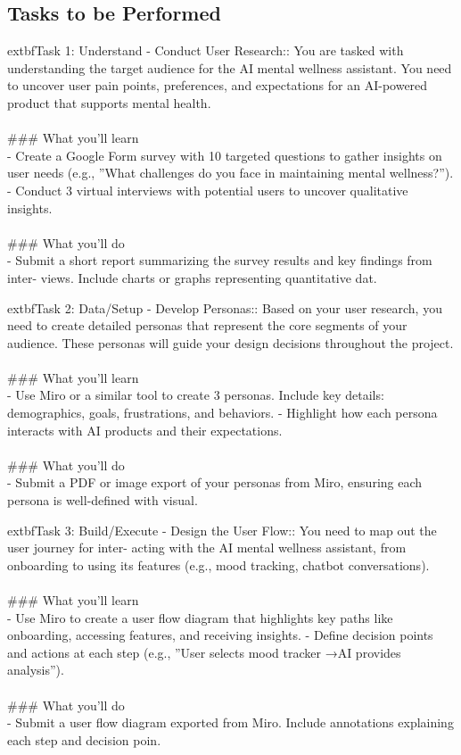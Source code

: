 \documentclass{article}
\begin{document}
\subsection*{Tasks to be Performed}
	extbf{Task 1:} Understand - Conduct User Research:: You are tasked with understanding the target audience for the AI mental wellness assistant. You need to uncover user pain points, preferences, and expectations for an AI-powered product that supports mental health. \\
 \\
### What you'll learn \\
- Create a Google Form survey with 10 targeted questions to gather insights on user needs (e.g., ”What challenges do you face in maintaining mental wellness?”). - Conduct 3 virtual interviews with potential users to uncover qualitative insights. \\
 \\
### What you'll do \\
- Submit a short report summarizing the survey results and key findings from inter- views. Include charts or graphs representing quantitative dat.

	extbf{Task 2:} Data/Setup - Develop Personas:: Based on your user research, you need to create detailed personas that represent the core segments of your audience. These personas will guide your design decisions throughout the project. \\
 \\
### What you'll learn \\
- Use Miro or a similar tool to create 3 personas. Include key details: demographics, goals, frustrations, and behaviors. - Highlight how each persona interacts with AI products and their expectations. \\
 \\
### What you'll do \\
- Submit a PDF or image export of your personas from Miro, ensuring each persona is well-defined with visual.

	extbf{Task 3:} Build/Execute - Design the User Flow:: You need to map out the user journey for inter- acting with the AI mental wellness assistant, from onboarding to using its features (e.g., mood tracking, chatbot conversations). \\
 \\
### What you'll learn \\
- Use Miro to create a user flow diagram that highlights key paths like onboarding, accessing features, and receiving insights. - Define decision points and actions at each step (e.g., ”User selects mood tracker →AI provides analysis”). \\
 \\
### What you'll do \\
- Submit a user flow diagram exported from Miro. Include annotations explaining each step and decision poin.
\end{document}
